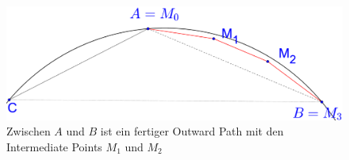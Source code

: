 \documentclass[a4paper,twoside]{IEEEtran}
\begin{document}
\begin{figure}[h!]
\centering
\includegraphics[width=1\linewidth]{outward_path_fertig.eps}
\caption{Zwischen $A $ und $B $ ist ein fertiger Outward Path mit den Intermediate Points $M_1 $ und $M_2 $}
\label{fig:outward_path_fertig}
\end{figure}




\end{document}
